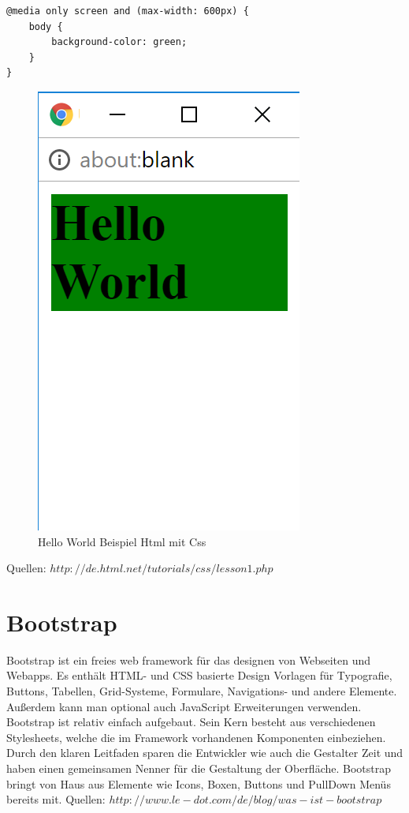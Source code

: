\begin{lstlisting}
@media only screen and (max-width: 600px) {
    body {
        background-color: green;
    }
}
\end{lstlisting}

\begin{figure}[H]
\begin{center}
	\includegraphics[scale=.6]{images/media.png}
\end{center}
	\caption{Hello World Beispiel Html mit Css}
	\label{fig:sample}
\end{figure}
Quellen: \cite{webster_visual_????} $http://de.html.net/tutorials/css/lesson1.php$

\section{Bootstrap}
Bootstrap ist ein freies web framework für das designen von Webseiten und Webapps. Es enthält HTML- und CSS basierte Design Vorlagen für Typografie, Buttons, Tabellen, Grid-Systeme, Formulare, Navigations- und andere Elemente. Außerdem kann man optional auch JavaScript Erweiterungen verwenden.
Bootstrap ist relativ einfach aufgebaut. Sein Kern besteht aus verschiedenen Stylesheets, welche die im Framework vorhandenen Komponenten einbeziehen.
Durch den klaren Leitfaden sparen die Entwickler wie auch die Gestalter  Zeit und haben einen gemeinsamen Nenner für die Gestaltung der Oberfläche.
Bootstrap bringt von Haus aus Elemente wie Icons, Boxen, Buttons und PullDown Menüs bereits mit.
Quellen: \cite{mirko_was_2013} $http://www.le-dot.com/de/blog/was-ist-bootstrap$

